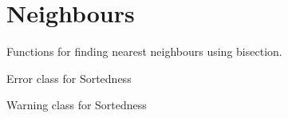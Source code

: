 \documentclass[letterpaper,10pt,english]{sphinxmanual}
\begin{document}
\section{Neighbours}
\label{\detokenize{users_guide:neighbours}}
\sphinxAtStartPar
Functions for finding nearest neighbours using bisection.

\begin{fulllineitems}
\label{\detokenize{users_guide:GeoSpatialTools.neighbours.SortedError}}
\pysigstartsignatures
\pysigline
{}
\pysigstopsignatures
\sphinxAtStartPar
Error class for Sortedness

\end{fulllineitems}


\begin{fulllineitems}
\label{\detokenize{users_guide:GeoSpatialTools.neighbours.SortedWarning}}
\pysigstartsignatures
\pysigline
{}
\pysigstopsignatures
\sphinxAtStartPar
Warning class for Sortedness

\end{fulllineitems}

\end{document}
